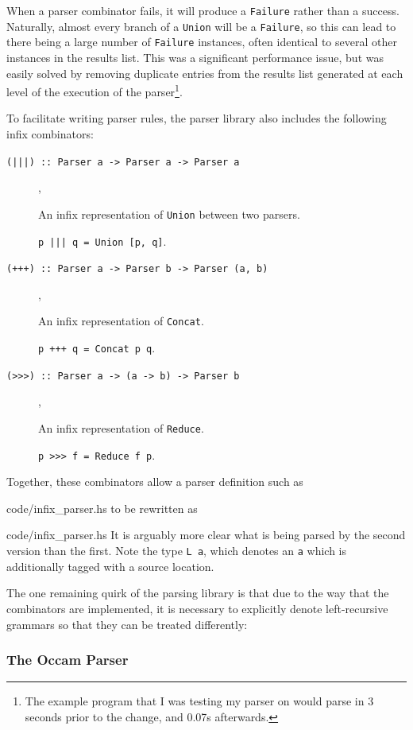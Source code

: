 When a parser combinator fails, it will produce a \texttt{Failure} rather than a
success. Naturally, almost every branch of a \texttt{Union} will be a
\texttt{Failure}, so this can lead to there being a large number of
\texttt{Failure} instances, often identical to several other instances in the
results list. This was a significant performance issue, but was easily solved by
removing duplicate entries from the results list generated at each level of the
execution of the parser\footnote{The example program that I was testing my
parser on would parse in 3 seconds prior to the change, and 0.07s afterwards.}.

To facilitate writing parser rules, the parser library also includes the
following infix combinators:
\begin{description}
  \item[\texttt{(|||) :: Parser a -> Parser a -> Parser a}],

    An infix representation of \texttt{Union} between two parsers.

    \texttt{p ||| q = Union [p, q]}.
  \item[\texttt{(+++) :: Parser a -> Parser b -> Parser (a, b)}],

    An infix representation of \texttt{Concat}.

    \texttt{p +++ q = Concat p q}.
  \item[\texttt{(>>>) :: Parser a -> (a -> b) -> Parser b}],

    An infix representation of \texttt{Reduce}.

    \texttt{p >>> f = Reduce f p}.
\end{description}
Together, these combinators allow a parser definition such as

    {code/infix_parser.hs}
to be rewritten as

    {code/infix_parser.hs}
It is arguably more clear what is being parsed by the second version than the
first. Note the type \texttt{L a}, which denotes an \texttt{a} which is
additionally tagged with a source location.

The one remaining quirk of the parsing library is that due to the way that the
combinators are implemented, it is necessary to explicitly denote left-recursive
grammars so that they can be treated differently:


\subsubsection{The Occam Parser} \label{occam-parser-impl}

